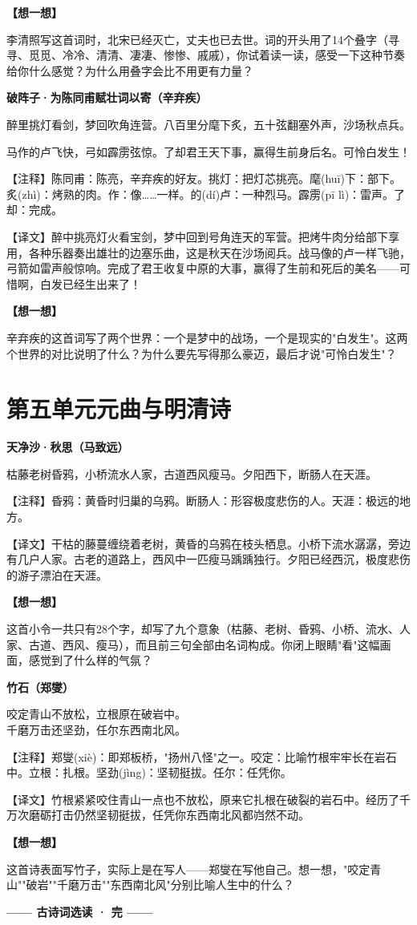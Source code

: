 \documentclass[a4paper,12pt]{ctexart}
\newcommand{\poemtitle}[1]{{\vspace{0.3cm}\noindent\textcolor{orange!80!black}{\large\bfseries #1}\par\vspace{0.1cm}}}
\newcommand{\annot}[1]{{\small\textcolor{blue!60!black}{#1}}}
\newcommand{\thinkq}{\vspace{0.2cm}\noindent\textcolor{orange!60!black}{\small\bfseries【想一想】}\par}
\begin{document}
\thinkq 李清照写这首词时，北宋已经灭亡，丈夫也已去世。词的开头用了14个叠字（寻寻、觅觅、冷冷、清清、凄凄、惨惨、戚戚），你试着读一读，感受一下这种节奏给你什么感觉？为什么用叠字会比不用更有力量？

\poemtitle{破阵子·为陈同甫赋壮词以寄（辛弃疾）}

醉里挑灯看剑，梦回吹角连营。八百里分麾下炙，五十弦翻塞外声，沙场秋点兵。

马作的卢飞快，弓如霹雳弦惊。了却君王天下事，赢得生前身后名。可怜白发生！

\annot{【注释】陈同甫：陈亮，辛弃疾的好友。挑灯：把灯芯挑亮。麾(huī)下：部下。炙(zhì)：烤熟的肉。作：像……一样。的(dí)卢：一种烈马。霹雳(pī lì)：雷声。了却：完成。}

\annot{【译文】醉中挑亮灯火看宝剑，梦中回到号角连天的军营。把烤牛肉分给部下享用，各种乐器奏出雄壮的边塞乐曲，这是秋天在沙场阅兵。战马像的卢一样飞驰，弓箭如雷声般惊响。完成了君王收复中原的大事，赢得了生前和死后的美名——可惜啊，白发已经生出来了！}

\thinkq 辛弃疾的这首词写了两个世界：一个是梦中的战场，一个是现实的"白发生"。这两个世界的对比说明了什么？为什么要先写得那么豪迈，最后才说"可怜白发生"？

\newpage

\section*{\textcolor{orange!80!black}{第五单元\quad 元曲与明清诗}}

\poemtitle{天净沙·秋思（马致远）}

枯藤老树昏鸦，小桥流水人家，古道西风瘦马。夕阳西下，断肠人在天涯。

\annot{【注释】昏鸦：黄昏时归巢的乌鸦。断肠人：形容极度悲伤的人。天涯：极远的地方。}

\annot{【译文】干枯的藤蔓缠绕着老树，黄昏的乌鸦在枝头栖息。小桥下流水潺潺，旁边有几户人家。古老的道路上，西风中一匹瘦马踽踽独行。夕阳已经西沉，极度悲伤的游子漂泊在天涯。}

\thinkq 这首小令一共只有28个字，却写了九个意象（枯藤、老树、昏鸦、小桥、流水、人家、古道、西风、瘦马），而且前三句全部由名词构成。你闭上眼睛"看"这幅画面，感觉到了什么样的气氛？

\poemtitle{竹石（郑燮）}

咬定青山不放松，立根原在破岩中。\\
千磨万击还坚劲，任尔东西南北风。

\annot{【注释】郑燮(xiè)：即郑板桥，"扬州八怪"之一。咬定：比喻竹根牢牢长在岩石中。立根：扎根。坚劲(jìng)：坚韧挺拔。任尔：任凭你。}

\annot{【译文】竹根紧紧咬住青山一点也不放松，原来它扎根在破裂的岩石中。经历了千万次磨砺打击仍然坚韧挺拔，任凭你东西南北风都岿然不动。}

\thinkq 这首诗表面写竹子，实际上是在写人——郑燮在写他自己。想一想，"咬定青山""破岩""千磨万击""东西南北风"分别比喻人生中的什么？

\vspace{0.5cm}

\begin{center}
\textcolor{blue!70!black}{\large\textbf{—— 古诗词选读 · 完 ——}}
\end{center}
\end{document}
